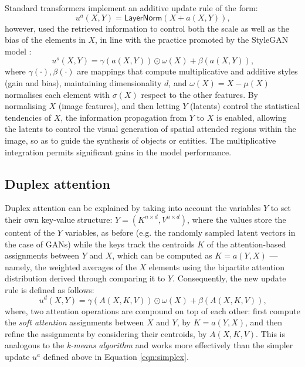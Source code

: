 \documentclass{article}
\begin{document}
	Standard transformers implement an additive update rule of the form:
	\begin{equation}
		\label{eqn:layernorm}
		u^a(X, Y)=\mathsf{LayerNorm}(X + a(X, Y)) \mbox{,}
	\end{equation}
	however, \cite{hudson2021generative} used the retrieved information to control both the scale as 
	well as the bias of the elements in $X$, in line with the practice promoted by the StyleGAN model 
	\cite{karras2019style}:
	\begin{equation}
		\label{eqn:simplex}
		u^s(X, Y)=\gamma (a(X, Y)) \odot \omega (X) + \beta (a(X, Y)) \mbox{,}
	\end{equation}
	where $\gamma(\cdot), \beta(\cdot)$ are mappings that compute multiplicative and additive styles 
	(gain and bias), maintaining dimensionality $d$, and $\omega (X) = X- \mu(X)$ normalises each 
	element with $\sigma(X)$ respect to the other features. By normalising $X$ (image features), and 
	then letting $Y$ (latents) control the statistical tendencies of $X$, the information propagation from 
	$Y$ to $X$ is enabled, allowing the latents to control the visual generation of spatial attended 
	regions within the image, so as to guide the synthesis of objects or entities.
	The multiplicative integration permits significant gains in the model performance. 
	
	\subsection{Duplex attention}
	Duplex attention can be explained by taking into account the variables $Y$ to set their own 
	key-value structure: $Y = (K^{n\times d} , V^{n\times d})$, where the values store the content of the 
	$Y$ variables, as before (e.g. the randomly sampled latent vectors in the case of GANs) while the 
	keys track the centroids $K$ of the attention-based assignments between $Y$ and $X$, which can 
	be computed as $K = a(Y, X)$ — namely, the weighted averages of the $X$ elements using the 
	bipartite attention distribution derived through comparing it to $Y$. 
	Consequently, the new update rule is defined as follows:
	\begin{equation}
		\label{eqn:duplex}
		u^d(X, Y )=\gamma (A(X, K, V)) \odot \omega (X) + \beta (A(X, K, V)) \mbox{,}
	\end{equation}
	where, two attention operations are compound on top of each other: first compute the \textit{soft 
		attention} assignments between $X$ and $Y$, by $K = a(Y, X)$, and then refine the assignments 
		by 
	considering their centroids, by $A(X, K, V)$. This is analogous to the \textit{k-means algorithm} and 
	works more effectively than the simpler update $u^a$ defined above in Equation \eqref{eqn:simplex}.
	
\end{document}
